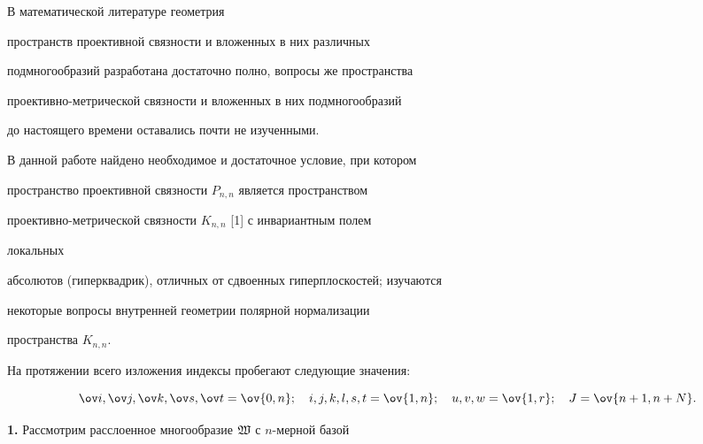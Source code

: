 \pagestyle{plain} %


 




\maketitle 


\label{begin} 


 


 


В математической литературе геометрия 


пространств проективной связности и вложенных в них различных 


подмногообразий разработана достаточно полно, вопросы же пространства 


проективно-метрической связности и вложенных в них подмногообразий 


до настоящего времени оставались почти не изученными. 


 


В данной работе найдено необходимое и достаточное условие, при котором 


пространство проективной связности $P_{n,n}$ является пространством 


проективно-метрической связности $K_{n,n}$ [1] с инвариантным полем 


локальных 


абсолютов (гиперквадрик), отличных от сдвоенных гиперплоскостей; изучаются 


некоторые вопросы внутренней геометрии полярной нормализации 


пространства $K_{n,n}$. 


 


 


На протяжении всего изложения индексы пробегают следующие значения: 


$$ 


\ov i,\ov j,\ov k,\ov s,\ov t=\ov{0,n};\quad i,j,k,l,s,t=\ov{1,n}; \quad 


u,v,w=\ov{1,r};\quad J=\ov{n+1,n+N}. 


$$ 


 


{\bf 1.} Рассмотрим расслоенное многообразие $\frak W$ с $n$-мерной базой 



